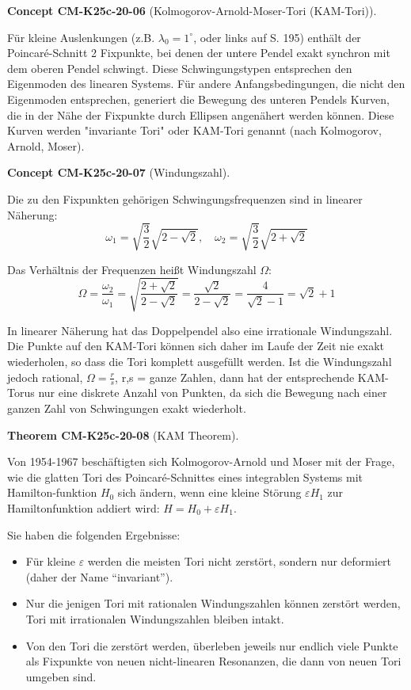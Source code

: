 \documentclass[10pt, letterpaper]{article}
\newcommand{\CustomHeading}[3]{%
  \par\medskip\noindent%
  \textbf{#1 #2} \textnormal{(#3)}.\enskip%
}
\newenvironment{THEO}[2]{\CustomHeading{Theorem}{#1}{#2}}{}
\newenvironment{CONC}[2]{\CustomHeading{Concept}{#1}{#2}}{}
\begin{document}
\begin{CONC}{CM-K25c-20-06}{Kolmogorov-Arnold-Moser-Tori (KAM-Tori)}
Für kleine Auslenkungen (z.B. $\lambda_0=1^\circ$, oder links auf S. 195) enthält der Poincaré-Schnitt 2 Fixpunkte, bei denen der untere Pendel exakt synchron mit dem oberen Pendel schwingt. Diese Schwingungstypen entsprechen den Eigenmoden des linearen
Systems. Für andere Anfangsbedingungen, die nicht den Eigenmoden entsprechen, generiert die Bewegung des unteren Pendels Kurven, die in der Nähe der Fixpunkte durch Ellipsen angenähert werden können. Diese Kurven werden "invariante Tori" oder KAM-Tori genannt (nach Kolmogorov, Arnold, Moser).
\end{CONC}

\begin{CONC}{CM-K25c-20-07}{Windungszahl}
Die zu den Fixpunkten gehörigen Schwingungsfrequenzen sind in linearer Näherung:
\[ \omega_1 = \sqrt{\frac{3}{2}}\sqrt{2-\sqrt{2}}, \quad \omega_2 = \sqrt{\frac{3}{2}}\sqrt{2+\sqrt{2}} \]

Das Verhältnis der Frequenzen heißt Windungszahl $\Omega$:
\[ \Omega = \frac{\omega_2}{\omega_1} = \sqrt{\frac{2+\sqrt{2}}{2-\sqrt{2}}} = \frac{\sqrt{2}}{2-\sqrt{2}} = \frac{4}{\sqrt{2}-1} = \sqrt{2}+1 \]

In linearer Näherung hat das Doppelpendel also eine irrationale Windungszahl. Die Punkte auf den KAM-Tori können sich daher im Laufe der Zeit nie exakt wiederholen, so dass die Tori komplett ausgefüllt werden. Ist die Windungszahl jedoch rational, $\Omega = \frac{r}{s}$, r,s = ganze Zahlen, dann hat der entsprechende KAM-Torus nur eine diskrete Anzahl von Punkten, da sich die Bewegung nach einer ganzen Zahl von Schwingungen exakt wiederholt.
\end{CONC}

\begin{THEO}{CM-K25c-20-08}{KAM Theorem}
Von 1954-1967 beschäftigten sich Kolmogorov-Arnold und Moser mit der Frage, wie die glatten Tori des Poincaré-Schnittes eines integrablen Systems mit Hamilton-funktion $H_0$ sich ändern, wenn eine kleine Störung $\varepsilon H_1$ zur
Hamiltonfunktion addiert wird: $H = H_0 + \varepsilon H_1$.

Sie haben die folgenden Ergebnisse:

\begin{itemize}
\item Für kleine $\varepsilon$ werden die meisten Tori nicht zerstört, sondern nur deformiert (daher der Name ``invariant'').
\item Nur die jenigen Tori mit rationalen Windungszahlen können zerstört werden, Tori mit irrationalen Windungszahlen bleiben intakt.
\item Von den Tori die zerstört werden, überleben jeweils nur endlich viele Punkte als Fixpunkte von neuen nicht-linearen Resonanzen, die dann von neuen Tori umgeben sind.
\end{itemize}
\end{THEO}
\end{document}
